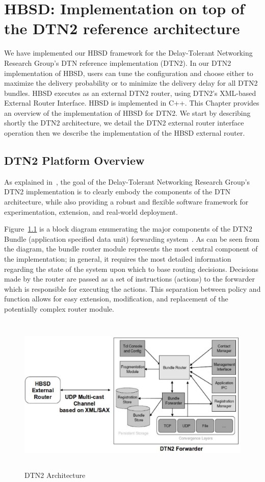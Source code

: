 \chapter{HBSD: Implementation on top of the DTN2 reference architecture}
\label{chapter:HBSD}
\minitoc

We have implemented our HBSD framework for the Delay-Tolerant Networking Research Group's DTN reference implementation (DTN2). 
In our DTN2 implementation of HBSD, users can tune the configuration and choose either to maximize the
delivery probability or to minimize the delivery delay for all DTN2 bundles. HBSD executes as an external DTN2 router, using DTN2's XML-based External Router Interface. HBSD is implemented in C++. This Chapter provides an overview of the implementation of HBSD for DTN2. We start by describing shortly the DTN2 architecture, we detail the DTN2 external router interface operation then we describe the implementation of the HBSD external router.

\section{DTN2 Platform Overview}
\label{DTN2}

As explained in~\cite{DTN2Manual}, the goal of the Delay-Tolerant Networking Research Group's DTN2 implementation is to clearly embody the components of the DTN architecture, while also providing a robust and flexible software framework for experimentation, extension, and real-world deployment.

Figure~\ref{DTN2-Arch} is a block diagram enumerating the major components of the DTN2 Bundle (application specified data 
unit) forwarding system~\cite{Demmer03implementingdelay}. As can be seen from the diagram, the bundle router module represents the most central component of the implementation; in general, it requires the most detailed information regarding the state of the system upon which to base routing decisions. Decisions made by the router are passed as a set of instructions (actions) to the forwarder which is responsible for executing the actions. This separation between policy and function allows for easy extension, modification, and replacement of the potentially complex router module. 

\begin{figure}[!h]
\centering
\includegraphics[width=5in,height=3in]{Chapitre4/HBSD-DTN2.eps}
\caption{DTN2 Architecture}
\label{DTN2-Arch}
\end{figure}

